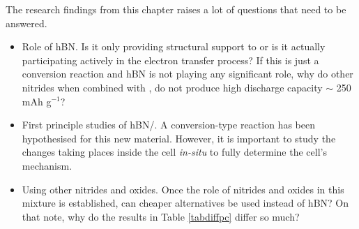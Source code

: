 The research findings from this chapter raises a lot of questions that need to be answered.
\begin{itemize}
    \item {\Large{Role of hBN.}} Is it only providing structural support to  or is it actually participating actively in the electron transfer process? If this is just a conversion reaction and hBN is not playing any significant role, why do other nitrides when combined with , do not produce high discharge capacity $\sim$ 250 mAh g$^{-1}$?
    \item {\large{First principle studies of hBN/.}} A conversion-type reaction has been hypothesised for this new material. However, it is important to study the changes taking places inside the cell \textit{in-situ} to fully determine the cell's mechanism. 
    \item {\Large{Using other nitrides and oxides.}} Once the role of nitrides and oxides in this mixture is established, can cheaper alternatives be used instead of hBN? On that note, why do the results in Table \ref{tabdiffpc} differ so much?
\end{itemize}

